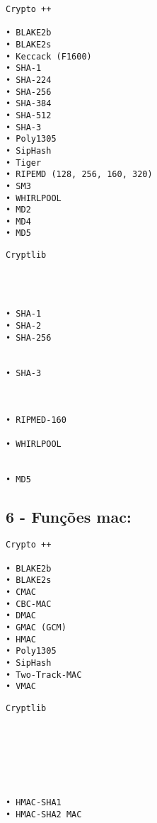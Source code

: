 \documentclass[
    article,            %
    11pt,               %
    oneside,            %
    a4paper,            %
    english,            %
    brazil,             %
    sumario=tradicional,
    ]{abntex2}
\begin{document}
\par\noindent
\begin{minipage}[t]{.49\textwidth}
\begin{Verbatim}[frame=single]
             Crypto ++

• BLAKE2b
• BLAKE2s
• Keccack (F1600)
• SHA-1
• SHA-224
• SHA-256
• SHA-384
• SHA-512
• SHA-3
• Poly1305
• SipHash
• Tiger
• RIPEMD (128, 256, 160, 320)
• SM3
• WHIRLPOOL
• MD2
• MD4
• MD5
\end{Verbatim}
\end{minipage}
\hfill
\begin{minipage}[t]{.49\textwidth}
\begin{Verbatim}[frame=single]
             Cryptlib




• SHA-1
• SHA-2
• SHA-256


• SHA-3



• RIPMED-160

• WHIRLPOOL


• MD5
\end{Verbatim}
\end{minipage}

\subsection*{\textbf{6 - Funções mac:}}

\par\noindent
\begin{minipage}[t]{.49\textwidth}
\begin{Verbatim}[frame=single]
             Crypto ++

• BLAKE2b
• BLAKE2s
• CMAC
• CBC-MAC
• DMAC
• GMAC (GCM)
• HMAC
• Poly1305
• SipHash
• Two-Track-MAC
• VMAC
\end{Verbatim}
\end{minipage}
\hfill
\begin{minipage}[t]{.49\textwidth}
\begin{Verbatim}[frame=single]
             Cryptlib







• HMAC-SHA1
• HMAC-SHA2 MAC



\end{Verbatim}
\end{minipage}
\end{document}
